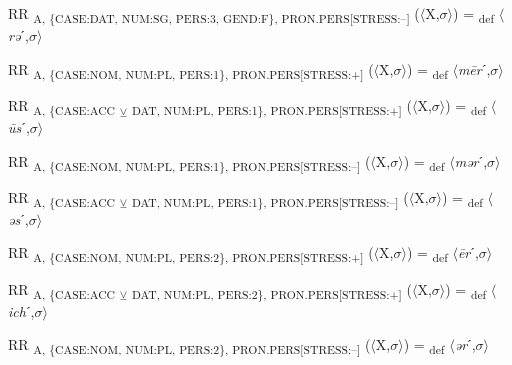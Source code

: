 {\begin{exe}
 RR \textsubscript{A, \{CASE:DAT, NUM:SG, PERS:3, GEND:F\}, PRON.PERS[STRESS:–]} ($\langle$X,$\sigma $$\rangle$) = \textsubscript{def} $\langle$\textit{rə}ˊ,$\sigma $$\rangle$
\end{exe}

\begin{exe}
 RR \textsubscript{A, \{CASE:NOM, NUM:PL, PERS:1\}, PRON.PERS[STRESS:+]} ($\langle$X,$\sigma $$\rangle$) = \textsubscript{def} $\langle$\textit{m\=er}ˊ,$\sigma $$\rangle$
\end{exe}

\begin{exe}
 RR \textsubscript{A, \{CASE:ACC} \textsubscript{${\veebar}$}\textsubscript{ DAT, NUM:PL, PERS:1\}, PRON.PERS[STRESS:+]} ($\langle$X,$\sigma $$\rangle$) = \textsubscript{def} $\langle$\textit{\=us}ˊ,$\sigma $$\rangle$
\end{exe}

\begin{exe}
 RR \textsubscript{A, \{CASE:NOM, NUM:PL, PERS:1\}, PRON.PERS[STRESS:–]} ($\langle$X,$\sigma $$\rangle$) = \textsubscript{def} $\langle$\textit{mər}ˊ,$\sigma $$\rangle$
\end{exe}

\begin{exe}
 RR \textsubscript{A, \{CASE:ACC} \textsubscript{${\veebar}$}\textsubscript{ DAT, NUM:PL, PERS:1\}, PRON.PERS[STRESS:–]} ($\langle$X,$\sigma $$\rangle$) = \textsubscript{def} $\langle$\textit{əs}ˊ,$\sigma $$\rangle$
\end{exe}

\begin{exe}
 RR \textsubscript{A, \{CASE:NOM, NUM:PL, PERS:2\}, PRON.PERS[STRESS:+]} ($\langle$X,$\sigma $$\rangle$) = \textsubscript{def} $\langle$\textit{\=er}ˊ,$\sigma $$\rangle$
\end{exe}

\begin{exe}
 RR \textsubscript{A, \{CASE:ACC} \textsubscript{${\veebar}$}\textsubscript{ DAT, NUM:PL, PERS:2\}, PRON.PERS[STRESS:+]} ($\langle$X,$\sigma $$\rangle$) = \textsubscript{def} $\langle$\textit{ich}ˊ,$\sigma $$\rangle$
\end{exe}

\begin{exe}
 RR \textsubscript{A, \{CASE:NOM, NUM:PL, PERS:2\}, PRON.PERS[STRESS:–]} ($\langle$X,$\sigma $$\rangle$) = \textsubscript{def} $\langle$\textit{ər}ˊ,$\sigma $$\rangle$
\end{exe}

}
